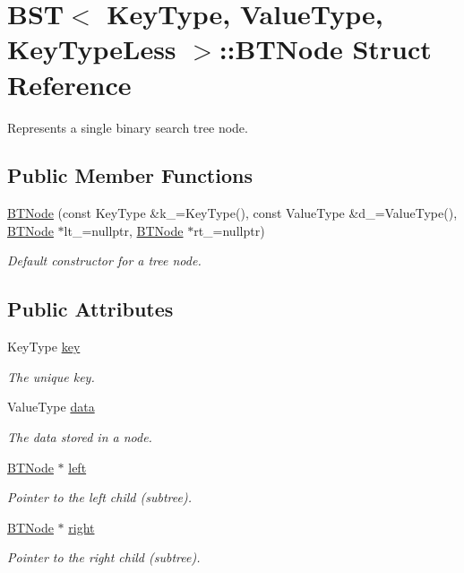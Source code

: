 \hypertarget{struct_b_s_t_1_1_b_t_node}{}\section{B\+ST$<$ Key\+Type, Value\+Type, Key\+Type\+Less $>$\+:\+:B\+T\+Node Struct Reference}
\label{struct_b_s_t_1_1_b_t_node}


Represents a single binary search tree node.  


\subsection*{Public Member Functions}
\begin{DoxyCompactItemize}
\item 
\hyperlink{struct_b_s_t_1_1_b_t_node_aa106b50f2a7c52a973a45295f9f574d8}{B\+T\+Node} (const Key\+Type \&k\+\_\+=Key\+Type(), const Value\+Type \&d\+\_\+=Value\+Type(), \hyperlink{struct_b_s_t_1_1_b_t_node}{B\+T\+Node} $\ast$lt\+\_\+=nullptr, \hyperlink{struct_b_s_t_1_1_b_t_node}{B\+T\+Node} $\ast$rt\+\_\+=nullptr)
\begin{DoxyCompactList}\small\item\em Default constructor for a tree node. \end{DoxyCompactList}\end{DoxyCompactItemize}
\subsection*{Public Attributes}
\begin{DoxyCompactItemize}
\item 
Key\+Type \hyperlink{struct_b_s_t_1_1_b_t_node_a0650926b6e3a4e2395bdadb5d6fefe44}{key}
\begin{DoxyCompactList}\small\item\em The unique key. \end{DoxyCompactList}\item 
Value\+Type \hyperlink{struct_b_s_t_1_1_b_t_node_ac081727fd869b860d3efba78d0432663}{data}
\begin{DoxyCompactList}\small\item\em The data stored in a node. \end{DoxyCompactList}\item 
\hyperlink{struct_b_s_t_1_1_b_t_node}{B\+T\+Node} $\ast$ \hyperlink{struct_b_s_t_1_1_b_t_node_ae0580d57138729a9b6b7644d25abd024}{left}
\begin{DoxyCompactList}\small\item\em Pointer to the left child (subtree). \end{DoxyCompactList}\item 
\hyperlink{struct_b_s_t_1_1_b_t_node}{B\+T\+Node} $\ast$ \hyperlink{struct_b_s_t_1_1_b_t_node_ac37767e7aed3f971b045bcf18728bbac}{right}
\begin{DoxyCompactList}\small\item\em Pointer to the right child (subtree). \end{DoxyCompactList}\end{DoxyCompactItemize}


